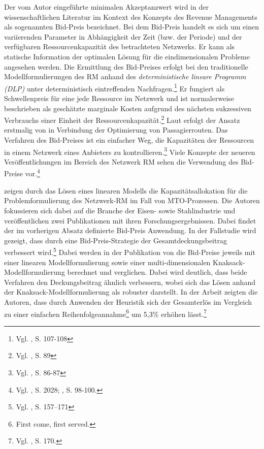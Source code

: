 Der vom Autor \cite{Kalyan:2002aa} eingeführte minimalen Akzeptanzwert wird in der wissenschaftlichen Literatur im Kontext des Konzepts des Revenue Managements als sogenannten Bid-Preis bezeichnet. Bei dem Bid-Preis handelt es sich um einen variierenden Parameter in Abhängigkeit der Zeit (bzw. der Periode) und der verfügbaren Ressourcenkapazität des betrachteten Netzwerks. Er kann als statische Information der optimalen Lösung für die eindimensionalen Probleme angesehen werden. Die Ermittlung des Bid-Preises erfolgt bei den traditionelle Modellformulierungen des RM anhand des \textit{deterministische lineare Programm (DLP)} unter deterministisch eintreffenden Nachfragen.\footnote{Vgl. \cite{talluri2004revenue}, S. 107-108} %
Er fungiert als Schwellenpreis für eine jede Ressource im Netzwerk und ist normalerweise beschrieben als geschätzte marginale Kosten aufgrund des nächsten sukzessiven Verbrauchs einer Einheit der Ressourcenkapazität.\footnote{Vgl. \cite{talluri2004theory}, S. 89} Laut \cite{gonsch2013using} erfolgt der Ansatz erstmalig von \cite{talluri2001airline} in Verbindung der Optimierung von Passagierrouten. Das Verfahren des Bid-Preises ist ein einfacher Weg, die Kapazitäten der Ressourcen in einem Netzwerk eines Anbieters zu kontrollieren.\footnote{Vgl. \cite{talluri2004theory}, S. 86-87\label{RMH}} Viele Konzepte der neueren Veröffentlichungen im Bereich des Netzwerk RM sehen die Verwendung des Bid-Preise vor.\footnote{Vgl. \cite{petrick2010dynamic}, S. 2028; \cite{gonsch2013using}, S. 98-100.}


\cite{rehkopf:2005aa} zeigen durch das Lösen eines linearen Modells die Kapazitätsallokation für die Problemformulierung des Netzwerk-RM im Fall von MTO-Prozessen. Die Autoren fokussieren sich dabei auf die Branche der Eisen- sowie Stahlindustrie und veröffentlichen zwei Publikationen mit ihren Forschungsergebnissen. Dabei findet der im vorherigen Absatz definierte Bid-Preis Anwendung. In der Fallstudie wird gezeigt, dass durch eine Bid-Preis-Strategie der Gesamtdeckungsbeitrag verbessert wird.\footnote{Vgl. \cite{Spengler:2007aa}, S. 157–171} Dabei werden in der Publikation von \cite{Spengler:2007aa} die Bid-Preise jeweils mit einer linearen Modellformulierung sowie einer multi-dimensionalen Knaksack-Modell\-for\-mu\-lier\-ung berechnet und verglichen. Dabei wird deutlich, dass beide Verfahren den Deckungsbeitrag ähnlich verbessern, wobei sich das Lösen anhand der Knaksack-Modell\-for\-mu\-lier\-ung als robuster darstellt. In der Arbeit zeigten die Autoren, dass durch Anwenden der Heuristik sich der Gesamterlös im Vergleich zu einer einfachen Reihenfolgeannahme\footnote{\glqq First come, first served.\grqq} um 5,3\% erhöhen lässt.\footnote{Vgl. \cite{Spengler:2007aa}, S. 170.}

